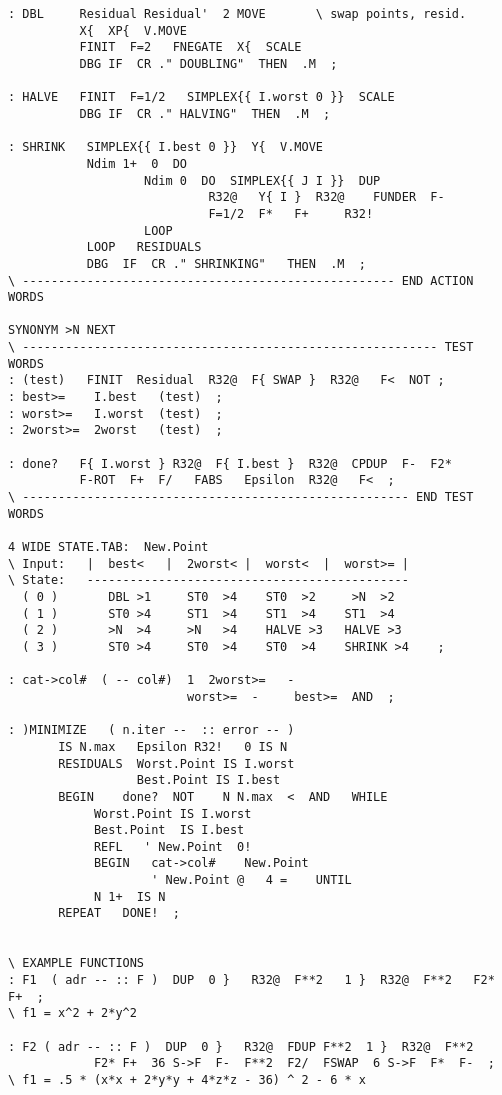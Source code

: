 \begin{lstlisting}
: DBL     Residual Residual'  2 MOVE       \ swap points, resid.
          X{  XP{  V.MOVE
          FINIT  F=2   FNEGATE  X{  SCALE
          DBG IF  CR ." DOUBLING"  THEN  .M  ;

: HALVE   FINIT  F=1/2   SIMPLEX{{ I.worst 0 }}  SCALE
          DBG IF  CR ." HALVING"  THEN  .M  ;

: SHRINK   SIMPLEX{{ I.best 0 }}  Y{  V.MOVE
           Ndim 1+  0  DO
                   Ndim 0  DO  SIMPLEX{{ J I }}  DUP
                            R32@   Y{ I }  R32@    FUNDER  F-
                            F=1/2  F*   F+     R32!
                   LOOP
           LOOP   RESIDUALS
           DBG  IF  CR ." SHRINKING"   THEN  .M  ;
\ ---------------------------------------------------- END ACTION WORDS

SYNONYM >N NEXT
\ ---------------------------------------------------------- TEST WORDS
: (test)   FINIT  Residual  R32@  F{ SWAP }  R32@   F<  NOT ;
: best>=    I.best   (test)  ;
: worst>=   I.worst  (test)  ;
: 2worst>=  2worst   (test)  ;

: done?   F{ I.worst } R32@  F{ I.best }  R32@  CPDUP  F-  F2*
          F-ROT  F+  F/   FABS   Epsilon  R32@   F<  ;
\ ------------------------------------------------------ END TEST WORDS

4 WIDE STATE.TAB:  New.Point
\ Input:   |  best<   |  2worst< |  worst<  |  worst>= |
\ State:   ---------------------------------------------
  ( 0 )       DBL >1     ST0  >4    ST0  >2     >N  >2
  ( 1 )       ST0 >4     ST1  >4    ST1  >4    ST1  >4
  ( 2 )       >N  >4     >N   >4    HALVE >3   HALVE >3
  ( 3 )       ST0 >4     ST0  >4    ST0  >4    SHRINK >4    ;

: cat->col#  ( -- col#)  1  2worst>=   -
                         worst>=  -     best>=  AND  ;

: )MINIMIZE   ( n.iter --  :: error -- )
       IS N.max   Epsilon R32!   0 IS N
       RESIDUALS  Worst.Point IS I.worst
                  Best.Point IS I.best
       BEGIN    done?  NOT    N N.max  <  AND   WHILE
            Worst.Point IS I.worst
            Best.Point  IS I.best
            REFL   ' New.Point  0!
            BEGIN   cat->col#    New.Point
                    ' New.Point @   4 =    UNTIL
            N 1+  IS N
       REPEAT   DONE!  ;


\ EXAMPLE FUNCTIONS
: F1  ( adr -- :: F )  DUP  0 }   R32@  F**2   1 }  R32@  F**2   F2*  F+  ;
\ f1 = x^2 + 2*y^2

: F2 ( adr -- :: F )  DUP  0 }   R32@  FDUP F**2  1 }  R32@  F**2
            F2* F+  36 S->F  F-  F**2  F2/  FSWAP  6 S->F  F*  F-  ;
\ f1 = .5 * (x*x + 2*y*y + 4*z*z - 36) ^ 2 - 6 * x


\end{lstlisting}
